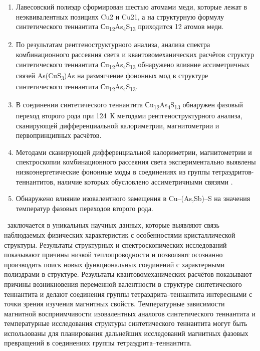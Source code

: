 \novelty
\begin{enumerate}
\item Лавесовский полиэдр сформирован шестью атомами меди, которые лежат в неэквивалентных позициях Cu2 и Cu21, а на структурную формулу синтетического теннантита Сu\textsubscript{12}As\textsubscript{4}S\textsubscript{13} приходится 12 атомов меди.
\item По результатам рентгеноструктурного анализа, анализа спектра комбинационного рассеяния света и квантовомеханических расчётов структур синтетического теннантита Сu\textsubscript{12}As\textsubscript{4}S\textsubscript{13} обнаружено влияние ассиметричных связей As(CuS\textsubscript{3})As на размягчение фононных мод в структуре синтетического теннантита Сu\textsubscript{12}As\textsubscript{4}S\textsubscript{13}.
\item В соединении  синтетического теннантита Сu\textsubscript{12}As\textsubscript{4}S\textsubscript{13} обнаружен фазовый переход второго рода
 при 124~К методами рентгеноструктурного анализа, сканирующей дифференциальной калориметрии, магнитометрии и первопринципных расчётов.
\item Методами сканирующей дифференциальной калориметрии, магнитометрии и спектроскопии комбинационного рассеяния света экспериментально выявлены низкоэнергетические фононные моды  в соединениях из группы тетраэдритов-теннантитов, наличие которых обусловлено  ассиметричными связями .
\item Обнаружено влияние изовалентного замещения в Cu--(As,Sb)--S на значения температур фазовых переходов второго рода.
\end{enumerate}

\influence\ заключается в уникальных научных данных, которые выявляют связь наблюдаемых физических характеристик с особенностями кристаллической структуры.
Результаты структурных и спектроскопических исследований показывают причины низкой теплопроводности и позволяют осознанно производить поиск новых функциональных соединений с характерными полиэдрами в структуре. Результаты квантовомеханических расчётов показывают причины возникновения переменной валентности в структуре синтетического теннантита и делают соединения группы тетраэдрита--теннантита интересными с точки зрения изучения магнитных свойств.
Температурные зависимости магнитной восприимчивости изовалентных аналогов синтетического теннантита и температурные исследования структуры синтетического теннантита могут быть использованы для планирования дальнейших исследований магнитных фазовых превращений в соединениях группы тетраэдрита--теннантита.

